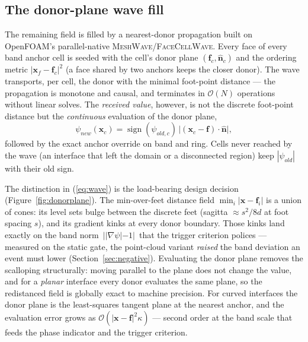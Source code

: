 \documentclass[preprint,3p,11pt]{elsarticle}
\newcommand{\psilev}{\psi}
\newcommand{\xc}{\mathbf{x}_c}
\newcommand{\nhat}{\hat{\mathbf{n}}}
\newcommand{\gradpsi}{\nabla\psilev}
\begin{document}
\subsection{The donor-plane wave fill}
\label{sec:wave}
The remaining field is filled by a nearest-donor propagation built on
OpenFOAM's parallel-native \textsc{MeshWave}/\textsc{FaceCellWave}. Every
face of every band anchor cell is seeded with the cell's donor plane
$(\mathbf{f}_c, \nhat_c)$ and the ordering metric
$|\mathbf{x}_f-\mathbf{f}_c|^2$ (a face shared by two anchors keeps the
closer donor). The wave transports, per cell, the donor with the minimal
foot-point distance --- the propagation is monotone and causal, and
terminates in $\mathcal{O}(N)$ operations without linear solves. The
\emph{received value}, however, is not the discrete foot-point distance but
the \emph{continuous} evaluation of the donor plane,
\begin{equation}
  \psilev_{new}(\xc)
  = \operatorname{sign}(\psilev_{old,c})\,
    \big|(\xc-\mathbf{f})\cdot\nhat\big|,
  \label{eq:wave}
\end{equation}
followed by the exact anchor override on band and ring. Cells never reached
by the wave (an interface that left the domain or a disconnected region)
keep $|\psilev_{old}|$ with their old sign.

The distinction in (\ref{eq:wave}) is the load-bearing design decision
(Figure~\ref{fig:donorplane}). The min-over-feet distance field
$\min_i|\mathbf{x}-\mathbf{f}_i|$ is a union of cones: its level sets bulge
between the discrete feet (sagitta $\approx s^2/8d$ at foot spacing $s$),
and its gradient kinks at every donor boundary. Those kinks land exactly on
the band norm $\,||\gradpsi|-1|\,$ that the trigger criterion polices ---
measured on the static gate, the point-cloud variant \emph{raised} the band
deviation an event must lower (Section~\ref{sec:negative}). Evaluating the
donor plane removes the scalloping structurally: moving parallel to the
plane does not change the value, and for a \emph{planar} interface every
donor evaluates the same plane, so the redistanced field is globally exact
to machine precision. For curved interfaces the donor plane is the
least-squares tangent plane at the nearest anchor, and the evaluation error
grows as $\mathcal{O}(|\mathbf{x}-\mathbf{f}|^2\kappa)$ --- second order at
the band scale that feeds the phase indicator and the trigger criterion.
\end{document}
